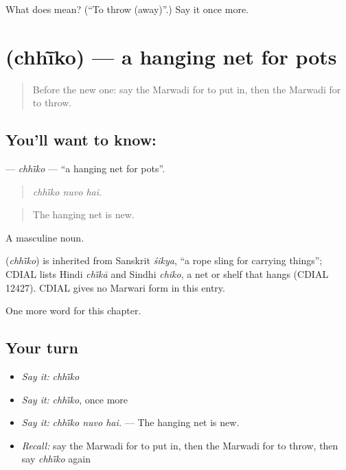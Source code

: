 \begin{tcolorbox}[breakable,colback=teal!4,colframe=teal!35!black,title={Before you move on}]
What does  mean? (\textquotedblleft{}To throw (away)\textquotedblright{}.) Say it once more.
\end{tcolorbox}
\section[\texorpdfstring{\mw{छींको} (chhī̃ko)}{छींको (chhī̃ko)}]{ (chhī̃ko) — a hanging net for pots}

\label{lesson:MW-C180-chhiko}



\begin{quote}
Before the new one: say the Marwadi for to put in, then the Marwadi for to throw.
\end{quote}

\subsection*{You'll want to know: }
\textbf{} — \emph{chhī̃ko} — \textquotedblleft{}a hanging net for pots\textquotedblright{}.

\begin{quote}
  
\end{quote}

\begin{quote}
\emph{chhī̃ko nuvo hai.}
\end{quote}

\begin{quote}
The hanging net is new.
\end{quote}

A masculine noun.

\begin{cousinweb}
\textbf{} (\emph{chhī̃ko}) is inherited from Sanskrit \emph{śikya}, \textquotedblleft{}a rope sling for carrying things\textquotedblright{}; CDIAL lists Hindi \emph{chī̃kā} and Sindhi \emph{chiko}, a net or shelf that hangs (CDIAL 12427). CDIAL gives no Marwari form in this entry.
\end{cousinweb}

\begin{grammarlens}[title={What you've built}]
One more word for this chapter.
\end{grammarlens}

\subsection*{Your turn}
\begin{itemize}
\raggedright
  \item \emph{Say it:} \emph{chhī̃ko}
  \item \emph{Say it:} \emph{chhī̃ko}, once more
  \item \emph{Say it:} \emph{chhī̃ko nuvo hai.} — The hanging net is new.
  \item \emph{Recall:} say the Marwadi for to put in, then the Marwadi for to throw, then say \emph{chhī̃ko} again
\end{itemize}

